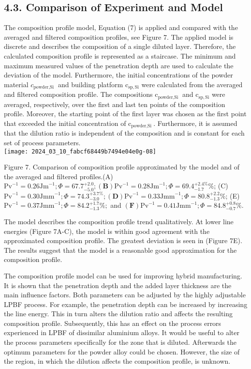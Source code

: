 \documentclass[10pt]{article}
\begin{document}
\subsection*{4.3. Comparison of Experiment and Model}
The composition profile model, Equation (7) is applied and compared with the averaged and filtered composition profiles, see Figure 7. The applied model is discrete and describes the composition of a single diluted layer. Therefore, the calculated composition profile is represented as a staircase. The minimum and maximum measured values of the penetration depth are used to calculate the deviation of the model. Furthermore, the initial concentrations of the powder material $c_{\text {powder,Si }}$ and building platform $\mathrm{c}_{\mathrm{sp}, \mathrm{Si}}$ were calculated from the averaged and filtered composition profile. The compositions $\mathrm{c}_{\text {powder,Si }}$ and $\mathrm{c}_{\mathrm{sp}, \mathrm{Si}}$ were averaged, respectively, over the first and last ten points of the composition profile. Moreover, the starting point of the first layer was chosen as the first point that exceeded the initial concentration of $\mathrm{c}_{\text {powder,Si }}$. Furthermore, it is assumed that the dilution ratio is independent of the composition and is constant for each set of process parameters.\\
\texttt{[image: 2024\_03\_10\_fabcf68449b7494e04e0g-08]}

Figure 7. Comparison of composition profile approximated by the model and of the averaged and filtered profiles.(A) $\mathrm{Pv}^{-1}=0.26 \mathrm{Jm}^{-1} ; \Phi=67.7_{-5.0}^{+2.0} ;(\mathbf{B}) \mathrm{Pv}^{-1}=0.28 \mathrm{Jm}^{-1} ; \Phi=69.4_{-1.7}^{+2.4 \%} \%$; (C) $\mathrm{Pv}^{-1}=0.30 \mathrm{Jmm}^{-1} ; \Phi=74.3_{-3.0}^{+3.7 \%} ;(\mathbf{D}) \mathrm{Pv}^{-1}=0.33 \mathrm{Jmm}^{-1} ; \Phi=80.8_{-1.3}^{+2.2} \%$; (E) $\mathrm{Pv}^{-1}=0.37 \mathrm{Jmm}^{-1} ; \Phi=84.2_{-1.3}^{+1.7} \% ;$ and $(\mathbf{F}) \mathrm{Pv}^{-1}=0.41 \mathrm{Jmm}^{-1} ; \Phi=84.8_{-0.7}^{+0.8} \%$.

The model describes the composition profile trend qualitatively. At lower line energies (Figure 7A-C), the model is within good agreement with the approximated composition profile. The greatest deviation is seen in (Figure 7E). The results suggest that the model is a reasonable good approximation for the composition profile.

The composition profile model can be used for improving hybrid manufacturing. It is shown that the penetration depth and the added layer thickness are the main influence factors. Both parameters can be adjusted by the highly adjustable LPBF process. For example, the penetration depth can be increased by increasing the line energy. This in turn alters the dilution ratio and affects the resulting composition profile. Subsequently, this has an effect on the process errors experienced in LPBF of dissimilar aluminium alloys. It would be useful to alter the process parameters specifically for the zone that is diluted. Afterwards the optimum parameters for the powder alloy could be chosen. However, the size of the region, in which the dilution affects the composition profile, is unknown.
\end{document}
